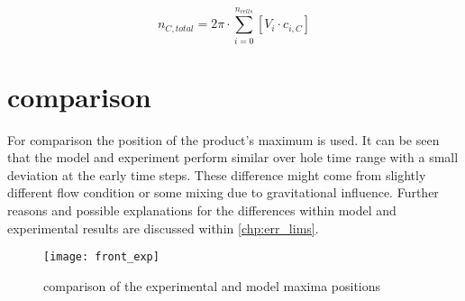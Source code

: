 \documentclass[../thesis.tex]{subfiles}
\begin{document}
\begin{equation}
	n_{C, total} = 2 \pi \cdot \sum_{i=0}^{n_{cells}} \left[ V_i \cdot c_{i, C} \right]
	\label{eqn: tot_prod} 
\end{equation}

\section{comparison}

For comparison the position of the product's maximum is used. It can be seen that the model and experiment perform similar over hole time range with a small deviation at the early time steps. These difference might come from slightly different flow condition or some mixing due to gravitational influence. Further reasons and possible explanations for the differences within model and experimental results are discussed within \autoref{chp:err_lims}.

\begin{figure}[htbp]
	\centering
	\texttt{[image: front\_exp]}
	\caption{comparison of the experimental and model maxima positions}
	\label{fig: comp_maxis}
\end{figure}
\end{document}
